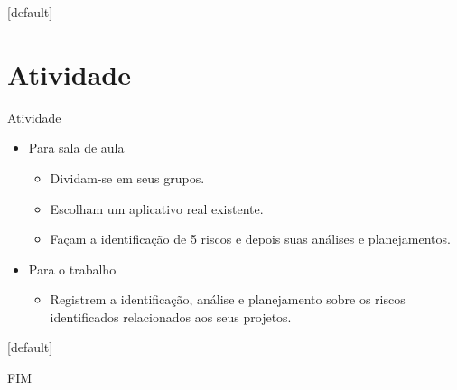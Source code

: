 \documentclass{beamer}
\begin{document}
[default]

\section{Atividade}

\begin{frame}{Atividade}
    \begin{itemize}
        \justifying
        \item Para sala de aula
        	\begin{itemize}
        		\justifying
        		\item Dividam-se em seus grupos.
        		\item Escolham um aplicativo real existente.
        		\item Façam a identificação de 5 riscos e depois suas análises e planejamentos.
        	\end{itemize}
        \item Para o trabalho
        	\begin{itemize}
        		\justifying
        		\item Registrem a identificação, análise e planejamento sobre os riscos identificados relacionados aos seus projetos.
        	\end{itemize}
    \end{itemize}
\end{frame}

[default]



\begin{frame}
    \centering
    \Large
    FIM
\end{frame}
    
\end{document}
